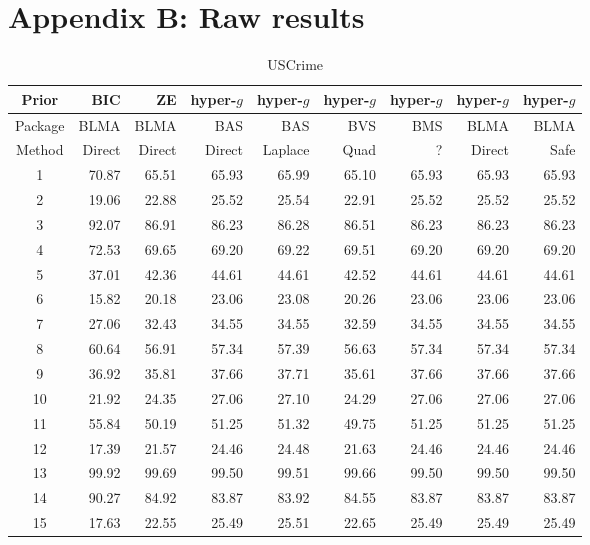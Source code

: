 \newpage 
 
\section*{Appendix B: Raw results}


\begin{table}[ht]
	\centering
	{\small 
	\begin{tabular}{c|r|r|rrrrrr}
		Prior   & BIC    & ZE     & hyper-$g$ & hyper-$g$ & hyper-$g$  & hyper-$g$ & hyper-$g$ & hyper-$g$ \\
		\hline 
		Package & BLMA   & BLMA   & BAS       & BAS       & BVS        & BMS       & BLMA      & BLMA       \\
		\hline 
		Method  & Direct & Direct & Direct    & Laplace   & Quad & ?         & Direct    & Safe      \\ 
		\hline
		1 & 70.87 & 65.51 & 65.93 & 65.99 & 65.10 & 65.93 & 65.93 & 65.93 \\ 
		2 & 19.06 & 22.88 & 25.52 & 25.54 & 22.91 & 25.52 & 25.52 & 25.52 \\ 
		3 & 92.07 & 86.91 & 86.23 & 86.28 & 86.51 & 86.23 & 86.23 & 86.23 \\ 
		4 & 72.53 & 69.65 & 69.20 & 69.22 & 69.51 & 69.20 & 69.20 & 69.20 \\ 
		5 & 37.01 & 42.36 & 44.61 & 44.61 & 42.52 & 44.61 & 44.61 & 44.61 \\ 
		6 & 15.82 & 20.18 & 23.06 & 23.08 & 20.26 & 23.06 & 23.06 & 23.06 \\ 
		7 & 27.06 & 32.43 & 34.55 & 34.55 & 32.59 & 34.55 & 34.55 & 34.55 \\ 
		8 & 60.64 & 56.91 & 57.34 & 57.39 & 56.63 & 57.34 & 57.34 & 57.34 \\ 
		9 & 36.92 & 35.81 & 37.66 & 37.71 & 35.61 & 37.66 & 37.66 & 37.66 \\ 
		10 & 21.92 & 24.35 & 27.06 & 27.10 & 24.29 & 27.06 & 27.06 & 27.06 \\ 
		11 & 55.84 & 50.19 & 51.25 & 51.32 & 49.75 & 51.25 & 51.25 & 51.25 \\ 
		12 & 17.39 & 21.57 & 24.46 & 24.48 & 21.63 & 24.46 & 24.46 & 24.46 \\ 
		13 & 99.92 & 99.69 & 99.50 & 99.51 & 99.66 & 99.50 & 99.50 & 99.50 \\ 
		14 & 90.27 & 84.92 & 83.87 & 83.92 & 84.55 & 83.87 & 83.87 & 83.87 \\ 
		15 & 17.63 & 22.55 & 25.49 & 25.51 & 22.65 & 25.49 & 25.49 & 25.49  \\ 
		\hline
	\end{tabular}
}
	\caption{USCrime}
	\label{tab:USCrimeResults1}
\end{table}


